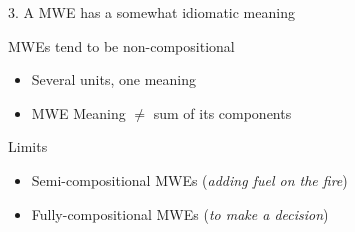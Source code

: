 \documentclass[serif, aspectratio=169]{beamer}
\begin{document}

\begin{frame}{3. A MWE has a somewhat idiomatic meaning}
    \begin{block}{MWEs tend to be non-compositional}
        \begin{itemize}
            \item Several units, one meaning
            \item MWE Meaning $\ne$ sum of its components
        \end{itemize}
    \end{block}
    \vfill
    \pause
    \begin{block}{Limits}
        \begin{itemize}
            \item Semi-compositional MWEs (\textit{adding fuel on the fire})
            \item Fully-compositional MWEs (\textit{to make a decision})
        \end{itemize}
    \end{block}
\end{frame}
\end{document}
